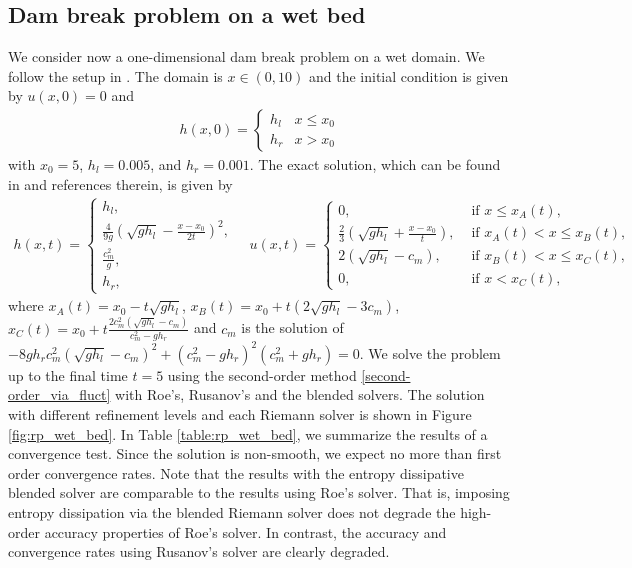 \documentclass[preprint, 11pt]{article}
\begin{document}
\subsection{Dam break problem on a wet bed}\label{sec:rp_wet_bed}
We consider now a one-dimensional dam break problem on a wet domain.
We follow the setup in \cite[\S 4.1.1]{delestre2013swashes}.
The domain is $x\in(0,10)$ and the initial condition is given by
$u(x,0)=0$ and
\begin{align*}
  h(x,0) =
  \begin{cases}
    h_l & x \leq x_0 \\
    h_r & x > x_0
  \end{cases}
\end{align*}
with $x_0=5$, $h_l=0.005$, and $h_r=0.001$.  The exact solution, which can be found in
\cite{delestre2013swashes} and references therein, is given by
\begin{align*}
  h(x,t) =
  \begin{cases}
    h_l, \\
    \frac{4}{9g}\left(\sqrt{gh_l}-\frac{x-x_0}{2t}\right)^2, \\
    \frac{c_m^2}{g}, \\
    h_r,
  \end{cases}
\quad
  u(x,t) =
  \begin{cases}
    0, &\mbox{ if } x\leq x_A(t), \\
    \frac{2}{3}\left(\sqrt{gh_l}+\frac{x-x_0}{t}\right), & \mbox{ if } x_A(t) < x\leq x_B(t), \\
    2(\sqrt{gh_l}-c_m), & \mbox{ if } x_B(t)<x\leq x_C(t), \\
    0, &\mbox{ if } x < x_C(t),
  \end{cases}
\end{align*}
where $x_A(t)=x_0-t\sqrt{gh_l}$, $x_B(t)=x_0+t\left(2\sqrt{gh_l}-3c_m\right)$,
$x_C(t)=x_0+t\frac{2c_m^2\left(\sqrt{gh_l}-c_m\right)}{c_m^2-gh_r}$ and
$c_m$ is the solution of
$-8gh_rc_m^2\left(\sqrt{gh_l}-c_m\right)^2+\left(c_m^2-gh_r\right)^2\left(c_m^2+gh_r\right)=0$.
We solve the problem up to the final time $t=5$ using the
second-order method \eqref{second-order_via_fluct}
with Roe's, Rusanov's and the blended solvers. The solution with different refinement levels
and each Riemann solver is shown in Figure \ref{fig:rp_wet_bed}.
In Table \ref{table:rp_wet_bed}, we summarize the results of a convergence test.
Since the solution is non-smooth, we expect no more than first order convergence rates. Note that the
results with the entropy dissipative blended solver are comparable to the results using Roe's solver.
That is, imposing entropy dissipation via the blended Riemann solver does not degrade the high-order
accuracy properties of Roe's solver.
In contrast, the accuracy and convergence rates using Rusanov's solver are clearly degraded.
\end{document}
